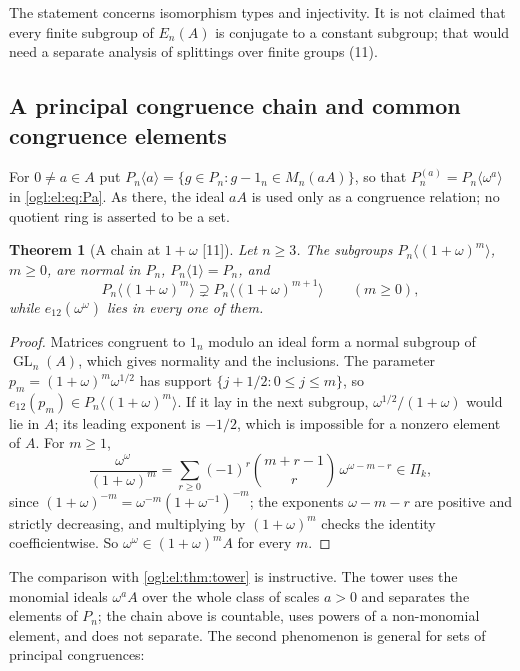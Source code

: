 \documentclass[11pt,oneside]{article}
\numberwithin{equation}{section}
\newtheorem{theorem}{Theorem}[section]
\theoremstyle{definition}
\theoremstyle{remark}
\newcommand{\GL}{\operatorname{GL}}
\newcommand{\src}[1]{\textup{\textsf{\small[#1]}}}
\begin{document}
The statement concerns isomorphism types and injectivity. It is not claimed
that every finite subgroup of $E_n(A)$ is conjugate to a constant subgroup;
that would need a separate analysis of splittings over finite groups (11).

\subsection{A principal congruence chain and common congruence elements}

For $0\ne a\in A$ put $P_n\langle a\rangle=\{g\in P_n:g-1_n\in M_n(aA)\}$, so that
$P_n^{(a)}=P_n\langle\omega^a\rangle$ in \eqref{ogl:el:eq:Pa}. As there, the
ideal $aA$ is used only as a congruence relation; no quotient ring is asserted to
be a set.

\begin{theorem}[A chain at $1+\omega$ \src{11}]\label{ogl:ker:thm:filtration}
Let $n\ge3$. The subgroups $P_n\langle(1+\omega)^m\rangle$, $m\ge0$, are normal in
$P_n$, $P_n\langle1\rangle=P_n$, and
\[
 P_n\langle(1+\omega)^m\rangle\supsetneq P_n\langle(1+\omega)^{m+1}\rangle
 \qquad(m\ge0),
\]
while $e_{12}(\omega^\omega)$ lies in every one of them.
\end{theorem}
\begin{proof}
Matrices congruent to $1_n$ modulo an ideal form a normal subgroup of
$\GL_n(A)$, which gives normality and the inclusions. The parameter
$p_m=(1+\omega)^m\omega^{1/2}$ has support $\{j+1/2:0\le j\le m\}$, so
$e_{12}(p_m)\in P_n\langle(1+\omega)^m\rangle$. If it lay in the next subgroup,
$\omega^{1/2}/(1+\omega)$ would lie in $A$; its leading exponent is $-1/2$, which
is impossible for a nonzero element of $A$. For $m\ge1$,
\begin{equation}\label{ogl:ker:eq:persistent}
 \frac{\omega^\omega}{(1+\omega)^m}
 =\sum_{r\ge0}(-1)^r\binom{m+r-1}{r}\,\omega^{\omega-m-r}\in\Pi_k ,
\end{equation}
since $(1+\omega)^{-m}=\omega^{-m}(1+\omega^{-1})^{-m}$; the exponents
$\omega-m-r$ are positive and strictly decreasing, and multiplying by
$(1+\omega)^m$ checks the identity coefficientwise. So $\omega^\omega\in(1+\omega)^mA$
for every $m$.
\end{proof}

The comparison with \cref{ogl:el:thm:tower} is instructive. The tower uses the
monomial ideals $\omega^aA$ over the whole class of scales $a>0$ and separates
the elements of $P_n$; the chain above is countable, uses powers of a
non-monomial element, and does not separate. The second phenomenon is general
for sets of principal congruences:
\end{document}
